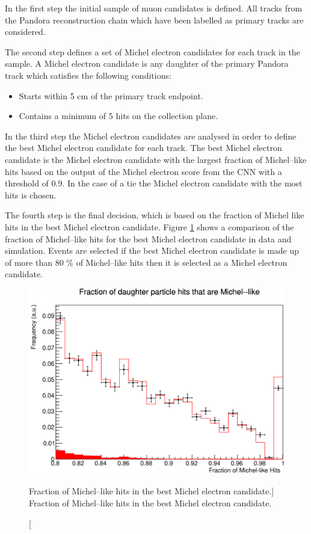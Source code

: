 In the first step the initial sample of muon candidates is defined. All tracks
from the Pandora reconstruction chain which have been labelled as primary tracks
are considered.

The second step defines a set of Michel electron candidates for each track in
the sample. A Michel electron candidate is any daughter of the primary Pandora
track which satisfies the following conditions:
\begin{itemize}
	\item Starts within 5 cm of the primary track endpoint.
	\item Contains a minimum of 5 hits on the collection plane.
\end{itemize}

In the third step the Michel electron candidates are analysed in order to define
the best Michel electron candidate for each track. The best Michel electron
candidate is the Michel electron candidate with the largest fraction of
Michel--like hits based on the output of the Michel electron score from the CNN
with a threshold of 0.9. In the case of a tie the Michel electron candidate with
the most hits is chosen.

The fourth step is the final decision, which is based on the fraction of Michel
like hits in the best Michel electron candidate. Figure 
\ref{fig:michel_like_frac} shows a comparison of the fraction of Michel--like 
hits for the best Michel electron candidate in \protodune{} data and 
simulation.  Events are selected if the best Michel electron candidate is made 
up of more than 80 \% of Michel--like hits then it is selected as a Michel 
electron candidate.
\begin{figure}
	\centering
	\includegraphics[width=\textwidth]{figures/michel_like_frac.pdf}
	\caption
	[Fraction of Michel--like hits in the best Michel electron candidate.]
	{Fraction of Michel--like hits in the best Michel electron candidate.}
	\label{fig:michel_like_frac}
\end{figure}

